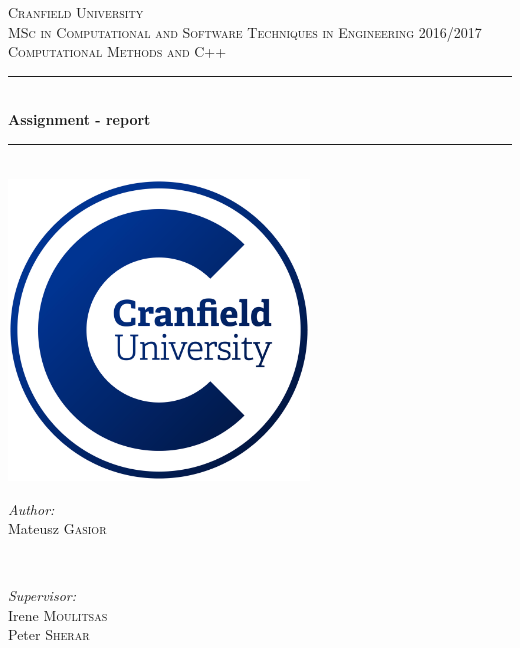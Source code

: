 \documentclass[a4paper]{report}
\begin{document}
	
	\begin{titlepage}
		\newcommand{\HRule}{\rule{\linewidth}{0.5mm}}
		
		\center
		
		\textsc{\LARGE Cranfield University}\\[1.5cm]
		\textsc{\Large MSc in Computational and Software Techniques in Engineering 2016/2017}\\[0.5cm]
		\textsc{\large Computational Methods and C++}\\[0.5cm]
		
		\HRule \\[0.4cm]
		{ \huge \bfseries Assignment - report}\\[0.4cm]
		\HRule \\[1.5cm]
		
		\includegraphics[width=8cm]{img/cranfield-logo}\\[1cm]
		
		\vfill
		\begin{minipage}{0.4\textwidth}
			\begin{flushleft} \large
				\emph{Author:}\\
				Mateusz \textsc{Gasior}
			\end{flushleft}
		\end{minipage}
		~
		\begin{minipage}{0.4\textwidth}
			\begin{flushright} \large
				\emph{Supervisor:} \\
				Irene \textsc{Moulitsas} \\
				Peter \textsc{Sherar}
			\end{flushright}
		\end{minipage}\\[2cm]
		

\end{titlepage}
\end{document}

